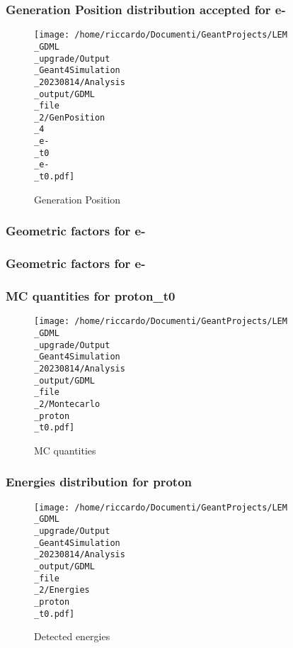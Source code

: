 \documentclass[8pt]{beamer}
\begin{document}
            \begin{frame}
                \frametitle{Generation Position distribution accepted for e-}
            
        \begin{figure}[h]
            \centering
            \texttt{[image: /home/riccardo/Documenti/GeantProjects/LEM\\\_GDML\\\_upgrade/Output\\\_Geant4Simulation\\\_20230814/Analysis\\\_output/GDML\\\_file\\\_2/GenPosition\\\_4\\\_e-\\\_t0\\\_e-\\\_t0.pdf]}
            \caption{Generation Position}
        \end{figure}
        
            \end{frame}
            
            \begin{frame}
                \frametitle{Geometric factors for e-}
            
            \end{frame}
            
            \begin{frame}
                \frametitle{Geometric factors for e-}
            
            \end{frame}
            
            \begin{frame}
                \frametitle{MC quantities for proton\_t0}
            
        \begin{figure}[h]
            \centering
            \texttt{[image: /home/riccardo/Documenti/GeantProjects/LEM\\\_GDML\\\_upgrade/Output\\\_Geant4Simulation\\\_20230814/Analysis\\\_output/GDML\\\_file\\\_2/Montecarlo\\\_proton\\\_t0.pdf]}
            \caption{MC quantities}
        \end{figure}
        
            \end{frame}
            
            \begin{frame}
                \frametitle{Energies distribution for proton}
            
        \begin{figure}[h]
            \centering
            \texttt{[image: /home/riccardo/Documenti/GeantProjects/LEM\\\_GDML\\\_upgrade/Output\\\_Geant4Simulation\\\_20230814/Analysis\\\_output/GDML\\\_file\\\_2/Energies\\\_proton\\\_t0.pdf]}
            \caption{Detected energies}
        \end{figure}
        
            \end{frame}
            
\end{document}
